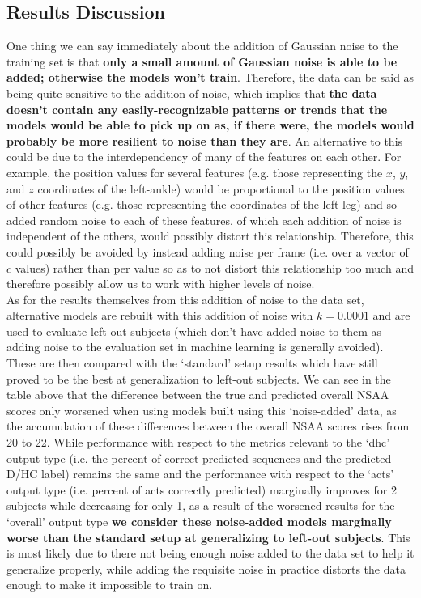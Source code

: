 \documentclass[12pt,twoside]{report}
\begin{document}
\subsection{Results Discussion}

\quad One thing we can say immediately about the addition of Gaussian noise to the training set is that \textbf{only a small amount of Gaussian noise is able to be added; otherwise the models won’t train}. Therefore, the data can be said as being quite sensitive to the addition of noise, which implies that \textbf{the data doesn’t contain any easily-recognizable patterns or trends that the models would be able to pick up on as, if there were, the models would probably be more resilient to noise than they are}. An alternative to this could be due to the interdependency of many of the features on each other. For example, the position values for several features (e.g. those representing the $x$, $y$, and $z$ coordinates of the left-ankle) would be proportional to the position values of other features (e.g. those representing the coordinates of the left-leg) and so added random noise to each of these features, of which each addition of noise is independent of the others, would possibly distort this relationship. Therefore, this could possibly be avoided by instead adding noise per frame (i.e. over a vector of $c$ values) rather than per value so as to not distort this relationship too much and therefore possibly allow us to work with higher levels of noise.\\

\quad As for the results themselves from this addition of noise to the data set, alternative models are rebuilt with this addition of noise with $k=0.0001$ and are used to evaluate left-out subjects (which don’t have added noise to them as adding noise to the evaluation set in machine learning is generally avoided). These are then compared with the ‘standard’ setup results which have still proved to be the best at generalization to left-out subjects. We can see in the table above that the difference between the true and predicted overall NSAA scores only worsened when using models built using this ‘noise-added’ data, as the accumulation of these differences between the overall NSAA scores rises from 20 to 22. While performance with respect to the metrics relevant to the ‘dhc’ output type (i.e. the percent of correct predicted sequences and the predicted D/HC label) remains the same and the performance with respect to the ‘acts’ output type (i.e. percent of acts correctly predicted) marginally improves for 2 subjects while decreasing for only 1, as a result of the worsened results for the ‘overall’ output type \textbf{we consider these noise-added models marginally worse than the standard setup at generalizing to left-out subjects}. This is most likely due to there not being enough noise added to the data set to help it generalize properly, while adding the requisite noise in practice distorts the data enough to make it impossible to train on.
\end{document}
